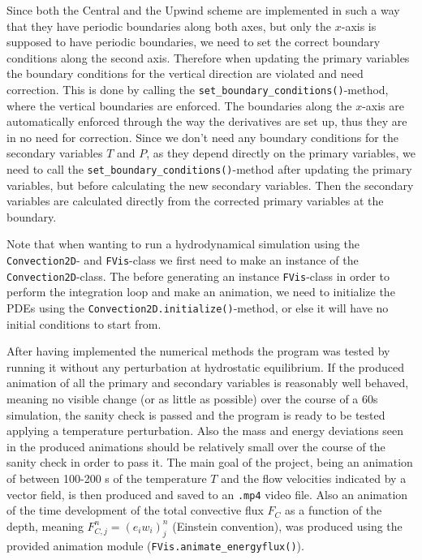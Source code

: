 \documentclass{emulateapj}
\begin{document}
	Since both the Central and the Upwind scheme are implemented in such a way that they have periodic boundaries along both axes, but only the $x$-axis is supposed to have periodic boundaries, we need to set the correct boundary conditions along the second axis. Therefore when updating the primary variables the boundary conditions for the vertical direction are violated and need correction. This is done by calling the \texttt{set\_boundary\_conditions()}-method, where the vertical boundaries are enforced. The boundaries along the $x$-axis are automatically enforced through the way the derivatives are set up, thus they are in no need for correction. Since we don't need any boundary conditions for the secondary variables $T$ and $P$, as they depend directly on the primary variables, we need to call the \texttt{set\_boundary\_conditions()}-method after updating the primary variables, but before calculating the new secondary variables. Then the secondary variables are calculated directly from the corrected primary variables at the boundary.
	
	Note that when wanting to run a hydrodynamical simulation using the \texttt{Convection2D}- and \texttt{FVis}-class we first need to make an instance of the \texttt{Convection2D}-class. The before generating an instance \texttt{FVis}-class in order to perform the integration loop and make an animation, we need to initialize the PDEs using the \texttt{Convection2D.initialize()}-method, or else it will have no initial conditions to start from.
	
	After having implemented the numerical methods the program was tested by running it without any perturbation at hydrostatic equilibrium. If the produced animation of all the primary and secondary variables is reasonably well behaved, meaning no visible change (or as little as possible) over the course of a 60s simulation, the sanity check is passed and the program is ready to be tested applying a temperature perturbation. Also the mass and energy deviations seen in the produced animations should be relatively small over the course of the sanity check in order to pass it. The main goal of the project, being an animation of between 100-200 s of the temperature $T$ and the flow velocities indicated by a vector field, is then produced and saved to an \texttt{.mp4} video file. Also an animation of the time development of  the total convective flux $F_C$ as a function of the depth, meaning $F^n_{C,j} = (e_i w_i)^n_j$ (Einstein convention), was produced using the provided animation module (\texttt{FVis.animate\_energyflux()}). 
	
\end{document}
